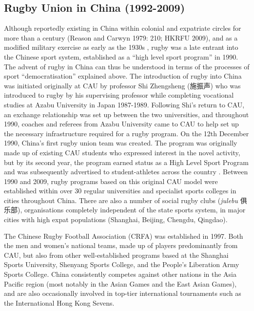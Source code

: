 {    \subsection{Rugby Union in China (1992-2009)}
Although reportedly existing in China within colonial and expatriate circles for more than a century (Reason and Carwyn 1979: 210; HKRFU 2009), and as a modified military exercise as early as the 1930s \citep[135]{Morris2004}, rugby was a late entrant into the Chinese sport system, established as a ``high level sport program'' in 1990.  The advent of rugby in China can thus be understood in terms of the processes of sport ``democratisation'' explained above.  The introduction of rugby into China was initiated originally at CAU by professor Shi Zhengsheng (施振声) who was introduced to rugby by his
supervising professor while completing vocational studies at Azabu University in Japan 1987-1989.  Following Shi’s return to CAU, an exchange relationship was set up between the two universities, and throughout 1990, coaches and referees from Azabu University came to CAU to help set up the necessary infrastructure required for a rugby program.  On the 12th December 1990, China’s first rugby union team was created.  The program was originally made up of existing CAU students who expressed interest in the novel activity, but by its second year, the program earned status as a High Level Sport Program and was subsequently advertised to student-athletes across the country \citep[2]{Xu2010}.  Between 1990 and 2009, rugby programs based on this original CAU model were established within over 30 regular universities and specialist sports colleges in cities throughout China.  There are also a number of social rugby clubs (\textit{julebu} 俱乐部), organisations completely independent of the state sports system, in major cities with high expat populations (Shanghai, Beijing, Chengdu, Qingdao).

The Chinese Rugby Football Association (CRFA) was established in 1997. Both the men and women’s national teams, made up of players predominantly from CAU, but also from other well-established programs based at the Shanghai Sports University, Shenyang Sports College, and the People’s Liberation Army Sports College. China consistently competes against other nations in the Asia Pacific region (most notably in the Asian Games and the East Asian Games), and are also occasionally involved in top-tier international tournaments such as the International Hong Kong Sevens.

}
